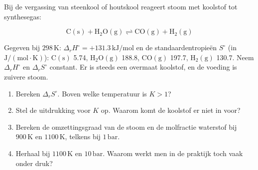 \begin{oefening}
Bij de vergassing van steenkool of houtskool reageert stoom met koolstof tot synthesegas:

\[
\mathrm{C(s) + H_2O(g) \rightleftharpoons CO(g) + H_2(g)}
\]

Gegeven bij \(298\,\mathrm{K}\): \(\Delta_r H^\circ = +131.3\,\mathrm{kJ/mol}\) en de standaardentropieën \(S^\circ\) (in \(\mathrm{J/(mol\cdot K)}\)): \(\mathrm{C(s)}\) 5.74, \(\mathrm{H_2O(g)}\) 188.8, \(\mathrm{CO(g)}\) 197.7, \(\mathrm{H_2(g)}\) 130.7. Neem \(\Delta_r H^\circ\) en \(\Delta_r S^\circ\) constant. Er is steeds een overmaat koolstof, en de voeding is zuivere stoom.

\begin{enumerate}
\item[(a)]
  Bereken \(\Delta_r S^\circ\). Boven welke temperatuur is \(K > 1\)?
\item[(b)]
  Stel de uitdrukking voor \(K\) op. Waarom komt de koolstof er niet in voor?
\item[(c)]
  Bereken de omzettingsgraad van de stoom en de molfractie waterstof bij \(900\,\mathrm{K}\) en \(1100\,\mathrm{K}\), telkens bij \(1\,\mathrm{bar}\).
\item[(d)]
  Herhaal bij \(1100\,\mathrm{K}\) en \(10\,\mathrm{bar}\). Waarom werkt men in de praktijk toch vaak onder druk?
\end{enumerate}
\end{oefening}
